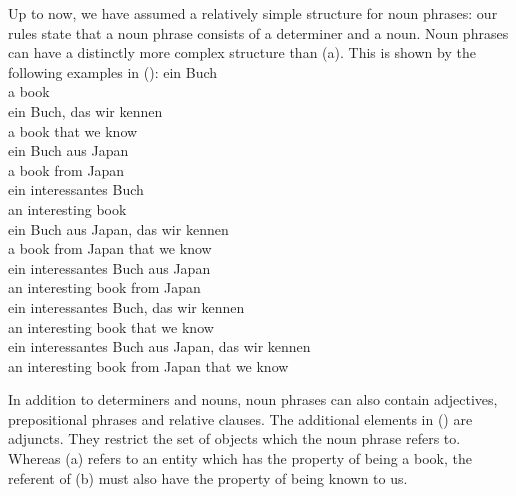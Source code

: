 \largerpage
Up to now, we have assumed a relatively simple structure for noun phrases: our rules state that a noun phrase consists of a determiner and a
noun. Noun phrases can have a distinctly more complex structure than (a). This is shown by the following examples in ():
\eal
\label{Beispiele-NP-Adjunkte}
\ex 
\gll ein Buch\\
     a   book\\
\ex
\label{ex-ein-Buch-das-wir-kennen} 
\gll ein Buch, das  wir kennen\\
     a   book  that we  know\\
\ex 
\label{ex-ein-Buch-aus-Japan}
\gll ein Buch aus  Japan\\
     a   book from Japan\\
\ex 
\gll ein interessantes Buch\\
     an   interesting   book\\
\ex 
\gll ein Buch aus  Japan, das  wir kennen\\
     a   book from Japan  that we  know\\
\ex 
\gll ein interessantes Buch aus  Japan\\
     an  interesting   book from Japan\\
\ex 
\gll ein interessantes Buch, das  wir kennen\\
     an  interesting   book  that we  know\\
\ex 
\gll ein interessantes Buch aus  Japan, das  wir kennen\\
     an  interesting   book from Japan  that we  know\\
\zl

\noindent
In addition to determiners and nouns, noun phrases can also contain adjectives, prepositional phrases and relative clauses. 
The additional elements in () are adjuncts. They restrict the set of objects which the noun phrase 
refers to. Whereas (a) refers to an entity which has the property of being a book, the referent of (b) must
also have the property of being known to us.

